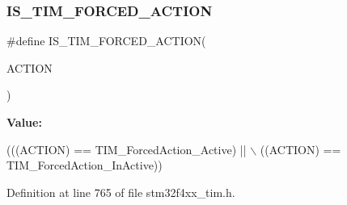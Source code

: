 \subsubsection{\texorpdfstring{I\+S\+\_\+\+T\+I\+M\+\_\+\+F\+O\+R\+C\+E\+D\+\_\+\+A\+C\+T\+I\+ON}{IS\_TIM\_FORCED\_ACTION}}
{\footnotesize\ttfamily \#define I\+S\+\_\+\+T\+I\+M\+\_\+\+F\+O\+R\+C\+E\+D\+\_\+\+A\+C\+T\+I\+ON(\begin{DoxyParamCaption}\item[{}]{A\+C\+T\+I\+ON }\end{DoxyParamCaption})}

{\bfseries Value\+:}
\begin{DoxyCode}
(((ACTION) == TIM\_ForcedAction\_Active) || \(\backslash\)
                                      ((ACTION) == TIM\_ForcedAction\_InActive))
\end{DoxyCode}


Definition at line 765 of file stm32f4xx\+\_\+tim.\+h.

